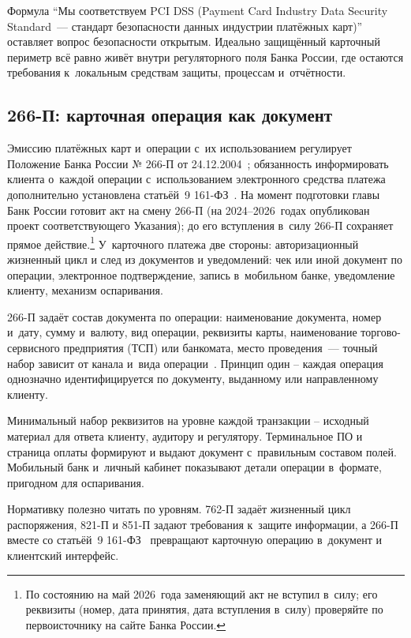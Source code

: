 Формула \enquote{Мы соответствуем PCI DSS (Payment Card Industry Data Security Standard~--- стандарт безопасности данных индустрии платёжных карт)} оставляет вопрос безопасности открытым. Идеально защищённый карточный периметр всё равно живёт внутри регуляторного поля Банка России, где остаются требования к~локальным средствам защиты, процессам и~отчётности.

\subsection*{266-П: карточная операция как документ}

Эмиссию платёжных карт и~операции с~их использованием регулирует Положение Банка России № 266-П от 24.12.2004~\cite{cbr-266p}; обязанность информировать клиента о~каждой операции с~использованием электронного средства платежа дополнительно установлена статьёй~9 161-ФЗ~\cite{fz-161}.
На момент подготовки главы Банк России готовит акт на смену 266-П (на 2024--2026~годах опубликован проект соответствующего Указания); до его вступления в~силу 266-П сохраняет прямое действие.\footnote{По состоянию на май 2026~года заменяющий акт не вступил в~силу; его реквизиты (номер, дата принятия, дата вступления в~силу) проверяйте по первоисточнику на сайте Банка России.}
У~карточного платежа две стороны: авторизационный жизненный цикл и след из документов и уведомлений: чек или иной документ по операции, электронное подтверждение, запись в~мобильном банке, уведомление клиенту, механизм оспаривания.

266-П задаёт состав документа по операции: наименование документа, номер и~дату, сумму и~валюту, вид операции, реквизиты карты, наименование торгово-сервисного предприятия (ТСП) или банкомата, место проведения~--- точный набор зависит от канала и~вида операции~\cite{cbr-266p}.
Принцип один -- каждая операция однозначно идентифицируется по документу, выданному или направленному клиенту.

Минимальный набор реквизитов на уровне каждой транзакции -- исходный материал для ответа клиенту, аудитору и регулятору. Терминальное ПО и страница оплаты формируют и выдают документ с~правильным составом полей. Мобильный банк и~личный кабинет показывают детали операции в~формате, пригодном для оспаривания.

Нормативку полезно читать по уровням. 762-П задаёт жизненный цикл
распоряжения, 821-П и 851-П задают требования к~защите информации,
а 266-П вместе со статьёй~9 161-ФЗ~\cite{cbr-266p,fz-161}
превращают карточную операцию в~документ и клиентский интерфейс.
